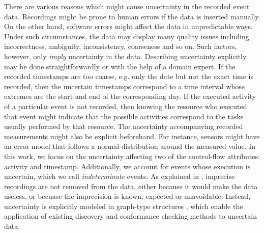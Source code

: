 There are various reasons which might cause uncertainty in the recorded event data.
Recordings might be prone to human errors if the data is inserted manually.
On the other hand, software errors might affect the data in unpredictable ways.
Under such circumstances, the data may display many quality issues including incorrectness, ambiguity, inconsistency, coarseness and so on.
Such factors, however, only \textit{imply} uncertainty in the data.
Describing uncertainty explicitly may be done straightforwardly or with the help of a domain expert.
If the recorded timestamps are too coarse, e.g. only the date but not the exact time is recorded, then the uncertain timestamps correspond to a time interval whose extremes are the start and end of the corresponding day.
If the executed activity of a particular event is not recorded, then knowing the resource who executed that event might indicate that the possible activities correspond to the tasks usually performed by that resource.
The uncertainty accompanying recorded measurements might also be explicit beforehand.
For instance, sensors might have an error model that follows a normal distribution around the measured value.
In this work, we focus on the uncertainty affecting two of the control-flow attributes: activity and timestamp.
Additionally, we account for events whose execution is uncertain, which we call \textit{indeterminate} events.
As explained in \cite{mining}, imprecise recordings are not removed from the data, either because it would make the data useless, or becuase the imprecision is known, expected or unavoidable.
Instead, uncertainty is explicitly modeled in graph-type structures \citep{mining,discovery,conformance}, which enable the application of existing discovery and conformance checking methods to uncertain data.
%
%
%
%
